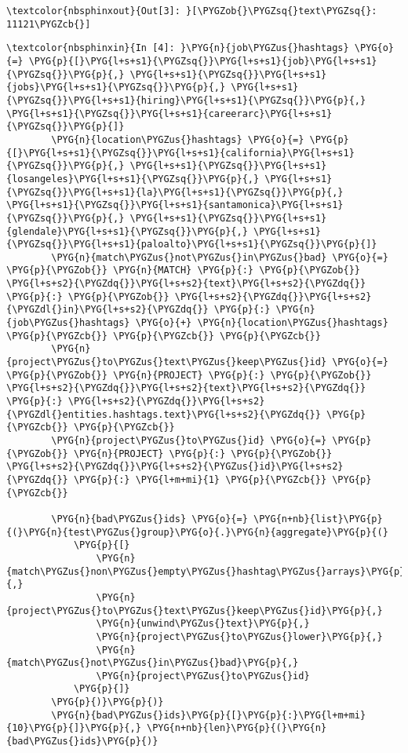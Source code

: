 \documentclass[letterpaper,10pt,english]{sphinxmanual}
\begin{document}
%
\begin{Verbatim}[commandchars=\\\{\}]
\textcolor{nbsphinxout}{Out[3]: }[\PYGZob{}\PYGZsq{}text\PYGZsq{}: 11121\PYGZcb{}]
\end{Verbatim}

%
\begin{Verbatim}[commandchars=\\\{\}]
\textcolor{nbsphinxin}{In [4]: }\PYG{n}{job\PYGZus{}hashtags} \PYG{o}{=} \PYG{p}{[}\PYG{l+s+s1}{\PYGZsq{}}\PYG{l+s+s1}{job}\PYG{l+s+s1}{\PYGZsq{}}\PYG{p}{,} \PYG{l+s+s1}{\PYGZsq{}}\PYG{l+s+s1}{jobs}\PYG{l+s+s1}{\PYGZsq{}}\PYG{p}{,} \PYG{l+s+s1}{\PYGZsq{}}\PYG{l+s+s1}{hiring}\PYG{l+s+s1}{\PYGZsq{}}\PYG{p}{,} \PYG{l+s+s1}{\PYGZsq{}}\PYG{l+s+s1}{careerarc}\PYG{l+s+s1}{\PYGZsq{}}\PYG{p}{]}
        \PYG{n}{location\PYGZus{}hashtags} \PYG{o}{=} \PYG{p}{[}\PYG{l+s+s1}{\PYGZsq{}}\PYG{l+s+s1}{california}\PYG{l+s+s1}{\PYGZsq{}}\PYG{p}{,} \PYG{l+s+s1}{\PYGZsq{}}\PYG{l+s+s1}{losangeles}\PYG{l+s+s1}{\PYGZsq{}}\PYG{p}{,} \PYG{l+s+s1}{\PYGZsq{}}\PYG{l+s+s1}{la}\PYG{l+s+s1}{\PYGZsq{}}\PYG{p}{,} \PYG{l+s+s1}{\PYGZsq{}}\PYG{l+s+s1}{santamonica}\PYG{l+s+s1}{\PYGZsq{}}\PYG{p}{,} \PYG{l+s+s1}{\PYGZsq{}}\PYG{l+s+s1}{glendale}\PYG{l+s+s1}{\PYGZsq{}}\PYG{p}{,} \PYG{l+s+s1}{\PYGZsq{}}\PYG{l+s+s1}{paloalto}\PYG{l+s+s1}{\PYGZsq{}}\PYG{p}{]}
        \PYG{n}{match\PYGZus{}not\PYGZus{}in\PYGZus{}bad} \PYG{o}{=} \PYG{p}{\PYGZob{}} \PYG{n}{MATCH} \PYG{p}{:} \PYG{p}{\PYGZob{}} \PYG{l+s+s2}{\PYGZdq{}}\PYG{l+s+s2}{text}\PYG{l+s+s2}{\PYGZdq{}} \PYG{p}{:} \PYG{p}{\PYGZob{}} \PYG{l+s+s2}{\PYGZdq{}}\PYG{l+s+s2}{\PYGZdl{}in}\PYG{l+s+s2}{\PYGZdq{}} \PYG{p}{:} \PYG{n}{job\PYGZus{}hashtags} \PYG{o}{+} \PYG{n}{location\PYGZus{}hashtags} \PYG{p}{\PYGZcb{}} \PYG{p}{\PYGZcb{}} \PYG{p}{\PYGZcb{}}
        \PYG{n}{project\PYGZus{}to\PYGZus{}text\PYGZus{}keep\PYGZus{}id} \PYG{o}{=} \PYG{p}{\PYGZob{}} \PYG{n}{PROJECT} \PYG{p}{:} \PYG{p}{\PYGZob{}} \PYG{l+s+s2}{\PYGZdq{}}\PYG{l+s+s2}{text}\PYG{l+s+s2}{\PYGZdq{}} \PYG{p}{:} \PYG{l+s+s2}{\PYGZdq{}}\PYG{l+s+s2}{\PYGZdl{}entities.hashtags.text}\PYG{l+s+s2}{\PYGZdq{}} \PYG{p}{\PYGZcb{}} \PYG{p}{\PYGZcb{}}
        \PYG{n}{project\PYGZus{}to\PYGZus{}id} \PYG{o}{=} \PYG{p}{\PYGZob{}} \PYG{n}{PROJECT} \PYG{p}{:} \PYG{p}{\PYGZob{}} \PYG{l+s+s2}{\PYGZdq{}}\PYG{l+s+s2}{\PYGZus{}id}\PYG{l+s+s2}{\PYGZdq{}} \PYG{p}{:} \PYG{l+m+mi}{1} \PYG{p}{\PYGZcb{}} \PYG{p}{\PYGZcb{}}
        
        \PYG{n}{bad\PYGZus{}ids} \PYG{o}{=} \PYG{n+nb}{list}\PYG{p}{(}\PYG{n}{test\PYGZus{}group}\PYG{o}{.}\PYG{n}{aggregate}\PYG{p}{(}
            \PYG{p}{[}
                \PYG{n}{match\PYGZus{}non\PYGZus{}empty\PYGZus{}hashtag\PYGZus{}arrays}\PYG{p}{,}
                \PYG{n}{project\PYGZus{}to\PYGZus{}text\PYGZus{}keep\PYGZus{}id}\PYG{p}{,}
                \PYG{n}{unwind\PYGZus{}text}\PYG{p}{,}
                \PYG{n}{project\PYGZus{}to\PYGZus{}lower}\PYG{p}{,}
                \PYG{n}{match\PYGZus{}not\PYGZus{}in\PYGZus{}bad}\PYG{p}{,}
                \PYG{n}{project\PYGZus{}to\PYGZus{}id}
            \PYG{p}{]}
        \PYG{p}{)}\PYG{p}{)}
        \PYG{n}{bad\PYGZus{}ids}\PYG{p}{[}\PYG{p}{:}\PYG{l+m+mi}{10}\PYG{p}{]}\PYG{p}{,} \PYG{n+nb}{len}\PYG{p}{(}\PYG{n}{bad\PYGZus{}ids}\PYG{p}{)}
\end{Verbatim}
\end{document}
